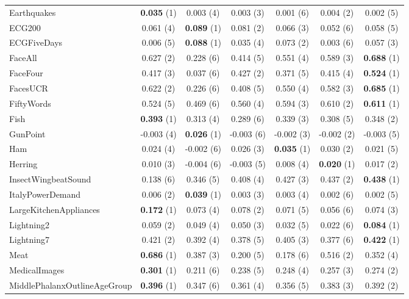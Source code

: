 \begin{table}[ht]
\begin{adjustbox}{width=\textwidth}
\begin{tabular}{lcccccc}
    Earthquakes & \textbf{0.035} (1) & 0.003 (4) & 0.003 (3) & 0.001 (6) & 0.004 (2) & 0.002 (5) \\
    ECG200 & 0.061 (4) & \textbf{0.089} (1) & 0.081 (2) & 0.066 (3) & 0.052 (6) & 0.058 (5) \\
    ECGFiveDays & 0.006 (5) & \textbf{0.088} (1) & 0.035 (4) & 0.073 (2) & 0.003 (6) & 0.057 (3) \\
    FaceAll & 0.627 (2) & 0.228 (6) & 0.414 (5) & 0.551 (4) & 0.589 (3) & \textbf{0.688} (1) \\
    FaceFour & 0.417 (3) & 0.037 (6) & 0.427 (2) & 0.371 (5) & 0.415 (4) & \textbf{0.524} (1) \\
    FacesUCR & 0.622 (2) & 0.226 (6) & 0.408 (5) & 0.550 (4) & 0.582 (3) & \textbf{0.685} (1) \\
    FiftyWords & 0.524 (5) & 0.469 (6) & 0.560 (4) & 0.594 (3) & 0.610 (2) & \textbf{0.611} (1) \\
    Fish & \textbf{0.393} (1) & 0.313 (4) & 0.289 (6) & 0.339 (3) & 0.308 (5) & 0.348 (2) \\
    GunPoint & -0.003 (4) & \textbf{0.026} (1) & -0.003 (6) & -0.002 (3) & -0.002 (2) & -0.003 (5) \\
    Ham & 0.024 (4) & -0.002 (6) & 0.026 (3) & \textbf{0.035} (1) & 0.030 (2) & 0.021 (5) \\
    Herring & 0.010 (3) & -0.004 (6) & -0.003 (5) & 0.008 (4) & \textbf{0.020} (1) & 0.017 (2) \\
    InsectWingbeatSound & 0.138 (6) & 0.346 (5) & 0.408 (4) & 0.427 (3) & 0.437 (2) & \textbf{0.438} (1) \\
    ItalyPowerDemand & 0.006 (2) & \textbf{0.039} (1) & 0.003 (3) & 0.003 (4) & 0.002 (6) & 0.002 (5) \\
    LargeKitchenAppliances & \textbf{0.172} (1) & 0.073 (4) & 0.078 (2) & 0.071 (5) & 0.056 (6) & 0.074 (3) \\
    Lightning2 & 0.059 (2) & 0.049 (4) & 0.050 (3) & 0.032 (5) & 0.022 (6) & \textbf{0.084} (1) \\
    Lightning7 & 0.421 (2) & 0.392 (4) & 0.378 (5) & 0.405 (3) & 0.377 (6) & \textbf{0.422} (1) \\
    Meat & \textbf{0.686} (1) & 0.387 (3) & 0.200 (5) & 0.178 (6) & 0.516 (2) & 0.352 (4) \\
    MedicalImages & \textbf{0.301} (1) & 0.211 (6) & 0.238 (5) & 0.248 (4) & 0.257 (3) & 0.274 (2) \\
    MiddlePhalanxOutlineAgeGroup & \textbf{0.396} (1) & 0.347 (6) & 0.361 (4) & 0.356 (5) & 0.383 (3) & 0.392 (2) \\

\end{tabular}
\end{adjustbox}
\end{table}
